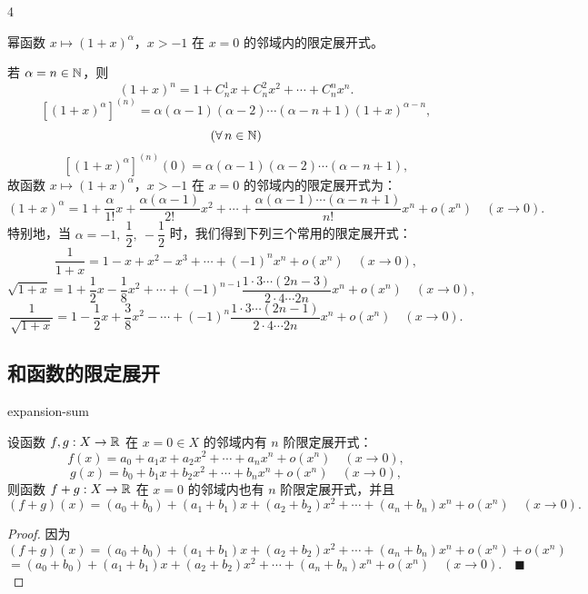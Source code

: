 \begin{sourceexample}{4}

幂函数 $x\longmapsto(1+x)^{\alpha}$，$x>-1$ 在 $x=0$ 的邻域内的限定展开式。

若 $\alpha=n\in\mathbb{N}$，则
\[(1+x)^n=1+C_n^1x+C_n^2x^2+\cdots+C_n^nx^n.\]
\[[(1+x)^{\alpha}]^{(n)}=\alpha(\alpha-1)(\alpha-2)\cdots(\alpha-n+1)(1+x)^{\alpha-n},\]
\[(\forall\,n\in\mathbb{N})\]
\[[(1+x)^{\alpha}]^{(n)}(0)=\alpha(\alpha-1)(\alpha-2)\cdots(\alpha-n+1),\]
故函数 $x\longmapsto(1+x)^{\alpha}$，$x>-1$ 在 $x=0$ 的邻域内的限定展开式为：
\[(1+x)^{\alpha}=1+\frac{\alpha}{1!}x+\frac{\alpha(\alpha-1)}{2!}x^{2}+\cdots+\frac{\alpha(\alpha-1)\cdots(\alpha-n+1)}{n!}x^{n}+o(x^{n})\quad(x\to0).\]
特别地，当 $\alpha=-1,\ \dfrac12,\ -\dfrac12$ 时，我们得到下列三个常用的限定展开式：
\[\frac{1}{1+x}=1-x+x^2-x^3+\cdots+(-1)^nx^n+o(x^n)\quad(x\to0),\]
\[\sqrt{1+x}=1+\frac{1}{2}x-\frac{1}{8}x^2+\cdots+(-1)^{n-1}\frac{1\cdot3\cdots(2n-3)}{2\cdot4\cdots2n}x^n+o(x^n)\quad(x\to0),\]
\[\frac{1}{\sqrt{1+x}}=1-\frac{1}{2}x+\frac{3}{8}x^2-\cdots+(-1)^n\frac{1\cdot3\cdots(2n-1)}{2\cdot4\cdots2n}x^n+o(x^n)\quad(x\to0).\]

\end{sourceexample}

\subsection{和函数的限定展开}

\begin{mythm}{}{expansion-sum}

设函数 $f,g:X\to\mathbb{R}$ 在 $x=0\in X$ 的邻域内有 $n$ 阶限定展开式：
\[f(x)=a_0+a_1x+a_2x^2+\cdots+a_nx^n+o(x^n)\quad(x\to0),\]
\[g(x)=b_0+b_1x+b_2x^2+\cdots+b_nx^n+o(x^n)\quad(x\to0),\]
则函数 $f+g:X\to\mathbb{R}$ 在 $x=0$ 的邻域内也有 $n$ 阶限定展开式，并且
\[(f+g)(x)=(a_0+b_0)+(a_1+b_1)x+(a_2+b_2)x^2+\cdots+(a_n+b_n)x^n+o(x^n)\quad(x\to0).\]

\end{mythm}

\begin{proof}

因为
\[(f+g)(x)=(a_0+b_0)+(a_1+b_1)x+(a_2+b_2)x^2+\cdots+(a_n+b_n)x^n+o(x^n)+o(x^n)\]
\[=(a_0+b_0)+(a_1+b_1)x+(a_2+b_2)x^2+\cdots+(a_n+b_n)x^n+o(x^n)\quad(x\to0).\quad\blacksquare\]

\end{proof}

